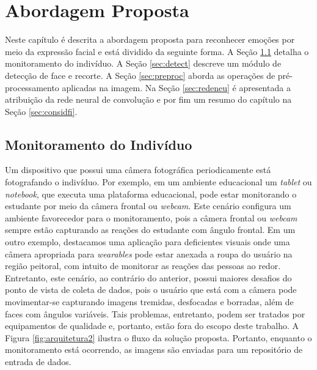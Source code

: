 \chapter{Abordagem Proposta}\label{sec:abordagemproposta}
Neste capítulo é descrita a abordagem proposta para reconhecer emoções por meio da expressão facial e está dividido da seguinte forma. A Seção \ref{sec:monit} detalha o monitoramento do indivíduo. A Seção \ref{sec:detect} descreve um módulo de detecção de face e recorte. A Seção \ref{sec:preproc} aborda as operações de pré-processamento aplicadas na imagem. Na Seção \ref{sec:redeneu} é apresentada a atribuição da rede neural de convolução e por fim um resumo do capítulo na Seção \ref{sec:considfi}.  

\section{Monitoramento do Indivíduo}\label{sec:monit}
Um dispositivo que possui uma câmera fotográfica periodicamente está fotografando o indivíduo. Por exemplo, em um ambiente educacional um \textit{tablet} ou \textit{notebook}, que executa uma plataforma educacional, pode estar monitorando o estudante por meio da câmera frontal ou \textit{webcam}. Este cenário configura um ambiente favorecedor para o monitoramento, pois a câmera frontal ou \textit{webcam} sempre estão capturando as reações do estudante com ângulo frontal. Em um outro exemplo, destacamos uma aplicação para deficientes visuais onde uma câmera apropriada para \textit{wearables} pode estar anexada a roupa do usuário na região peitoral, com intuito de monitorar as reações das pessoas ao redor. Entretanto, este cenário, ao contrário do anterior, possui maiores desafios do ponto de vista de coleta de dados, pois o usuário que está com a câmera pode movimentar-se capturando imagens tremidas, desfocadas e borradas, além de faces com ângulos variáveis. Tais problemas, entretanto, podem ser tratados por equipamentos de qualidade e, portanto, estão fora do escopo deste trabalho. A Figura \ref{fig:arquitetura2} ilustra o fluxo da solução proposta. Portanto, enquanto o monitoramento está ocorrendo, as imagens são enviadas para um repositório de entrada de dados.


